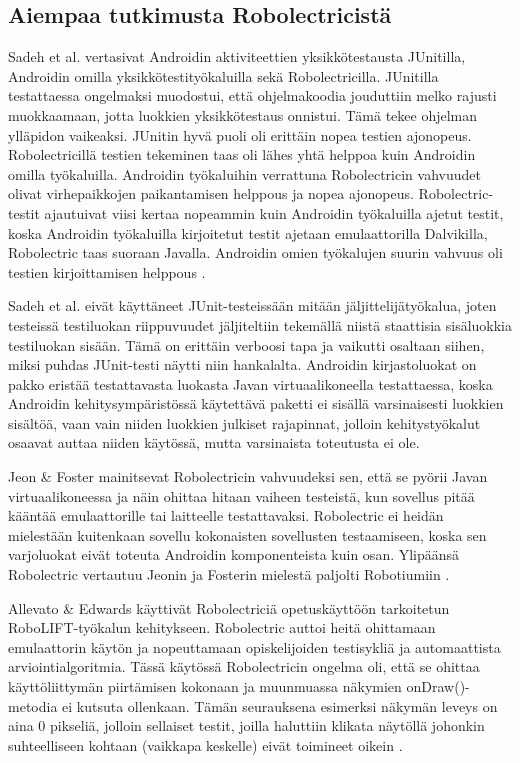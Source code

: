 \subsection{Aiempaa tutkimusta Robolectricistä}

Sadeh et al. vertasivat Androidin aktiviteettien yksikkötestausta JUnitilla, Androidin omilla yksikkötestityökaluilla sekä Robolectricilla. JUnitilla testattaessa ongelmaksi muodostui, että ohjelmakoodia jouduttiin melko rajusti muokkaamaan, jotta luokkien yksikkötestaus onnistui. Tämä tekee ohjelman ylläpidon vaikeaksi. JUnitin hyvä puoli oli erittäin nopea testien ajonopeus. Robolectricillä testien tekeminen taas oli lähes yhtä helppoa kuin Androidin omilla työkaluilla. Androidin työkaluihin verrattuna Robolectricin vahvuudet olivat virhepaikkojen paikantamisen helppous ja nopea ajonopeus. Robolectric-testit ajautuivat viisi kertaa nopeammin kuin Androidin työkaluilla ajetut testit, koska Androidin työkaluilla kirjoitetut testit ajetaan emulaattorilla Dalvikilla, Robolectric taas suoraan Javalla. Androidin omien työkalujen suurin vahvuus oli testien kirjoittamisen helppous \cite{sadehetal11}.

Sadeh et al. eivät käyttäneet JUnit-testeissään mitään jäljittelijätyökalua, joten testeissä testiluokan riippuvuudet jäljiteltiin tekemällä niistä staattisia sisäluokkia testiluokan sisään. Tämä on erittäin verboosi tapa ja vaikutti osaltaan siihen, miksi puhdas JUnit-testi näytti niin hankalalta. Androidin kirjastoluokat on pakko eristää testattavasta luokasta Javan virtuaalikoneella testattaessa, koska Androidin kehitysympäristössä käytettävä paketti ei sisällä varsinaisesti luokkien sisältöä, vaan vain niiden luokkien julkiset rajapinnat, jolloin kehitystyökalut osaavat auttaa niiden käytössä, mutta varsinaista toteutusta ei ole.

Jeon \& Foster mainitsevat Robolectricin vahvuudeksi sen, että se pyörii Javan virtuaalikoneessa ja näin ohittaa hitaan vaiheen testeistä, kun sovellus pitää kääntää emulaattorille tai laitteelle testattavaksi. Robolectric ei heidän mielestään kuitenkaan sovellu kokonaisten sovellusten testaamiseen, koska sen varjoluokat eivät toteuta Androidin komponenteista kuin osan. Ylipäänsä Robolectric vertautuu Jeonin ja Fosterin mielestä paljolti Robotiumiin \cite{troyd}.

Allevato \& Edwards käyttivät Robolectriciä opetuskäyttöön tarkoitetun RoboLIFT-työkalun kehitykseen. Robolectric auttoi heitä ohittamaan emulaattorin käytön ja nopeuttamaan opiskelijoiden testisykliä ja automaattista arviointialgoritmia. Tässä käytössä Robolectricin ongelma oli, että se ohittaa käyttöliittymän piirtämisen kokonaan ja muunmuassa näkymien onDraw()-metodia ei kutsuta ollenkaan. Tämän seurauksena esimerksi näkymän leveys on aina 0 pikseliä, jolloin sellaiset testit, joilla haluttiin klikata näytöllä johonkin suhteelliseen kohtaan (vaikkapa keskelle) eivät toimineet oikein \cite{robolift}.

